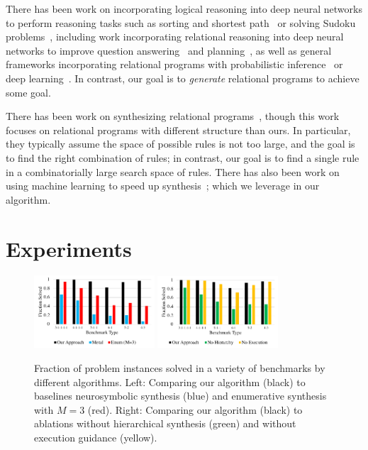 There has been work on incorporating logical reasoning into deep neural networks to perform reasoning tasks such as sorting and shortest path~\cite{dong2019neural} or solving Sudoku problems~\cite{wang2019satnet}, including work incorporating relational reasoning into deep neural networks to improve question answering~\cite{santoro2017simple} and planning~\cite{santoro2018relational}, as well as general frameworks incorporating relational programs with probabilistic inference~\cite{de2007problog} or deep learning~\cite{cohen2018tensorlog,manhaeve2018deepproblog}. In contrast, our goal is to \emph{generate} relational programs to achieve some goal.

There has been work on synthesizing relational programs~\cite{albarghouthi2017constraint,si2018syntax,raghothaman2019provenance,si2019synthesizing}, though this work focuses on relational programs with different structure than ours. In particular, they typically assume the space of possible rules is not too large, and the goal is to find the right combination of rules; in contrast, our goal is to find a single rule in a combinatorially large search space of rules. There has also been work on using machine learning to speed up synthesis~\cite{menon2013machine,balog2017deepcoder,parisotto2017neuro,bunel2018leveraging,feng2018program,ellis2018dreamcoder}; which we leverage in our algorithm.





\section{Experiments}

\begin{figure}[t]
\centering
\includegraphics[width=0.4\textwidth]{baselines.pdf}
\hspace{0.5in}
\includegraphics[width=0.4\textwidth]{ablations.pdf}
\caption{Fraction of problem instances solved in a variety of benchmarks by different algorithms. Left: Comparing our algorithm (black) to baselines neurosymbolic synthesis (blue) and enumerative synthesis with $M=3$ (red). Right: Comparing our algorithm (black) to ablations without hierarchical synthesis (green) and without execution guidance (yellow).} %
\label{fig:baselines}
\end{figure}

